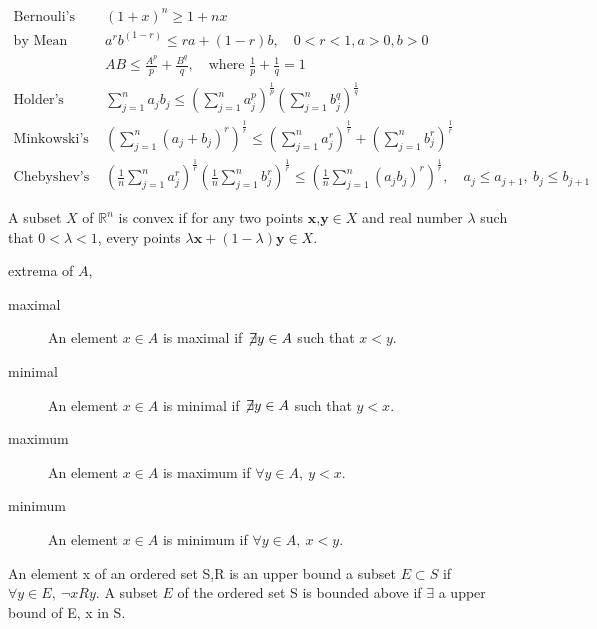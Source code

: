 	\begin{remark}
		\begin{align}
			\text{Bernouli's inequality, } & (1+x)^n \ge 1+nx \\
			\text{by Mean Value Theorem, } & a^r b^{(1-r)} \le ra + (1-r)b,\quad 0 < r < 1, a > 0, b > 0\\
			& AB \le \frac{A^p}{p} + \frac{B^q}{q},\quad \text{where }\frac{1}{p}+\frac{1}{q} = 1 \\
			\text{Holder's inequality, } & \sum_{j = 1}^n a_jb_j \le \left( \sum_{j = 1}^n a_j^p \right)^\frac{1}{p} \left( \sum_{j = 1}^n b_j^q \right)^\frac{1}{q} \\
			\text{Minkowski's inequality, } & \left( \sum_{j = 1}^n (a_j + b_j)^r \right)^\frac{1}{r} \le \left( \sum_{j = 1}^n a_j^r \right)^\frac{1}{r} + \left( \sum_{j = 1}^n b_j^r \right)^\frac{1}{r} \\
			\text{Chebyshev's inequality, } & \left( \frac{1}{n} \sum_{j = 1}^n a_j^r \right)^\frac{1}{r} \left( \frac{1}{n} \sum_{j = 1}^n b_j^r \right)^\frac{1}{r} \le \left( \frac{1}{n} \sum_{j = 1}^n (a_jb_j)^r \right)^\frac{1}{r},\quad a_j \le a_{j+1},\ b_j \le b_{j+1}
		\end{align}
	\end{remark}
	\begin{definition}
		A subset $X$ of $\mathbb{R}^n$ is convex if for any two points $\textbf{x,y} \in X$ and real number $\lambda$ such that $0 < \lambda < 1$, every points $\lambda \textbf{x} + (1-\lambda)\textbf{y} \in X$. 
	\end{definition}
	\begin{definition} extrema of $A$,
		\begin{description}
			\item[maximal] An element $x \in A$ is maximal if $\not\!\exists y \in A$ such that $x<y$.
			\item[minimal] An element $x \in A$ is minimal if $\not\!\exists y \in A$ such that $y<x$.
			\item[maximum] An element $x \in A$ is maximum if $\forall y \in A,\ y<x$.
			\item[minimum] An element $x \in A$ is minimum if $\forall y \in A,\ x<y$.
		\end{description}
	\end{definition}
	\begin{definition}
		An element x of an ordered set S,R is an upper bound a subset $E \subset S$ if $\forall y \in E,\ \neg xRy$. A subset $E$ of the ordered set S is bounded above if $\exists$ a upper bound of E, x in S.
	\end{definition}
